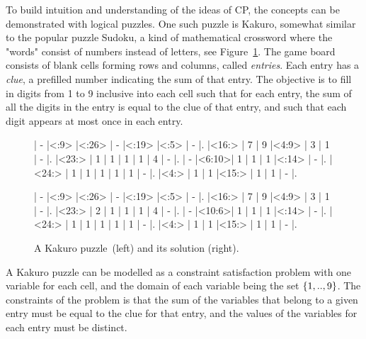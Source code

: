 \documentclass[a4paper,11pt]{article}
\numberwithin{equation}{section}
\begin{document}
To build intuition and understanding of the ideas of CP,
the concepts can be demonstrated with logical puzzles. One such
puzzle is Kakuro, somewhat similar to the popular puzzle Sudoku,
a kind of mathematical crossword where the "words" consist
of numbers instead of letters, see Figure~\ref{fig:kakuro}.
The game board consists of 
blank cells forming rows and columns, called \emph{entries}.
Each entry has a \emph{clue}, a prefilled number indicating the sum of that entry.
The objective is to fill
in digits from 1 to 9 inclusive into each cell such that for each entry,
the sum of all the digits in the entry is equal to the clue of that entry,
and such that each digit appears at most once in each entry.

\begin{figure}
  \centering
  \begin{minipage}{.45\textwidth}
    \begin{Kakuro}{6}{6}
      |  -   |<:9>  |<:26> |  -   |<:19> |<:5>  |  -   |.
      |<16:> |  7   |  9   |<4:9> |  3   |  1   |  -   |.
      |<23:> |  1   |  1   |  1   |  1   |  4   |  -   |.
      |  -   |<6:10>|  1   |  1   |  1   |<:14> |  -   |.
      |<24:> |  1   |  1   |  1   |  1   |  1   |  -   |.
      |<4:>  |  1   |  1   |<15:> |  1   |  1   |  -   |.
    \end{Kakuro}
  \end{minipage}
  \begin{minipage}{.45\textwidth}
    \PuzzleSolution
    \begin{Kakuro}{6}{6}
      |  -   |<:9>  |<:26> |  -   |<:19> |<:5>  |  -   |.
      |<16:> |  7   |  9   |<4:9> |  3   |  1   |  -   |.
      |<23:> |  2   |  1   |  1   |  1   |  4   |  -   |.
      |  -   |<10:6>|  1   |  1   |  1   |<:14> |  -   |.
      |<24:> |  1   |  1   |  1   |  1   |  1   |  -   |.
      |<4:>  |  1   |  1   |<15:> |  1   |  1   |  -   |.
    \end{Kakuro}
  \end{minipage}
  \caption{A Kakuro puzzle~\protect\footnotemark (left) and its solution (right).}
  \label{fig:kakuro}
\end{figure}


A Kakuro puzzle can be modelled as a constraint satisfaction problem with one variable
for each cell, and the domain of each variable being the set $\left\{1,..,9\right\}$.
The constraints of the problem is that the sum of the variables that
belong to a given entry must be equal to the clue for that entry, and the
values of the variables for each entry must be distinct.
\end{document}
